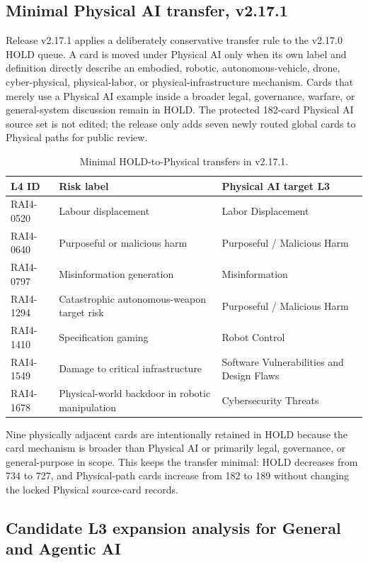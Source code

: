 \documentclass[11pt,a4paper]{article}
\begin{document}
\subsection{Minimal Physical AI transfer, v2.17.1}

Release v2.17.1 applies a deliberately conservative transfer rule to the
v2.17.0 HOLD queue. A card is moved under Physical AI only when its own label
and definition directly describe an embodied, robotic, autonomous-vehicle,
drone, cyber-physical, physical-labor, or physical-infrastructure mechanism.
Cards that merely use a Physical AI example inside a broader legal,
governance, warfare, or general-system discussion remain in HOLD. The protected
182-card Physical AI source set is not edited; the release only adds seven
newly routed global cards to Physical paths for public review.

\begin{table}[ht]
\centering
\caption{Minimal HOLD-to-Physical transfers in v2.17.1.}
\label{tab:v2171-minimal-physical-transfer}
\begin{tabular}{lll}
\toprule
L4 ID & Risk label & Physical AI target L3 \\
\midrule
RAI4-0520 & Labour displacement & Labor Displacement \\
RAI4-0640 & Purposeful or malicious harm & Purposeful / Malicious Harm \\
RAI4-0797 & Misinformation generation & Misinformation \\
RAI4-1294 & Catastrophic autonomous-weapon target risk & Purposeful / Malicious Harm \\
RAI4-1410 & Specification gaming & Robot Control \\
RAI4-1549 & Damage to critical infrastructure & Software Vulnerabilities and Design Flaws \\
RAI4-1678 & Physical-world backdoor in robotic manipulation & Cybersecurity Threats \\
\bottomrule
\end{tabular}
\end{table}

Nine physically adjacent cards are intentionally retained in HOLD because the
card mechanism is broader than Physical AI or primarily legal, governance, or
general-purpose in scope. This keeps the transfer minimal: HOLD decreases from
734 to 727, and Physical-path cards increase from 182 to 189 without changing
the locked Physical source-card records.

\subsection{Candidate L3 expansion analysis for General and Agentic AI}
\end{document}
